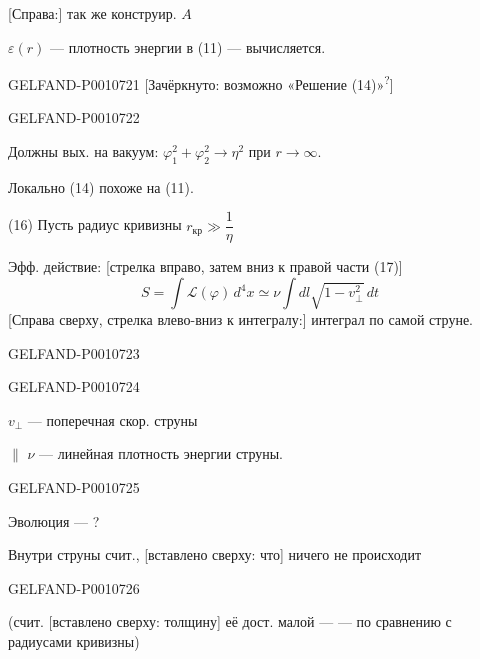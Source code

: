 [Справа:] так же конструир. $A$

$\varepsilon(r)$ — плотность энергии в (11) — вычисляется.


\begin{GelfandAdjacentEvidence}{GELFAND-P001072}{1}
[Зачёркнуто: возможно «Решение (14)»\textsuperscript{?}]
\end{GelfandAdjacentEvidence}
\begin{GelfandAdjacentEvidence}{GELFAND-P001072}{2}


Должны вых. на вакуум: $\varphi_1^2+\varphi_2^2\to\eta^2$ при $r\to\infty$.

Локально (14) похоже на (11).

(16) Пусть радиус кривизны $r_{\text{кр}}\gg\dfrac1\eta$

Эфф. действие: [стрелка вправо, затем вниз к правой части (17)]
\begin{equation*}
S=\int\mathcal L(\varphi)\,d^4x\simeq\nu\int dl\sqrt{1-v_{\perp}^2}\,dt
\tag{17}
\end{equation*}
[Справа сверху, стрелка влево-вниз к интегралу:] интеграл по самой струне.
\end{GelfandAdjacentEvidence}
\begin{GelfandAdjacentEvidence}{GELFAND-P001072}{3}

\end{GelfandAdjacentEvidence}
\begin{GelfandAdjacentEvidence}{GELFAND-P001072}{4}


$v_\perp$ — поперечная скор. струны

\(\parallel\) $\nu$ — линейная плотность энергии струны.
\end{GelfandAdjacentEvidence}
\begin{GelfandAdjacentEvidence}{GELFAND-P001072}{5}


Эволюция — ?

Внутри струны счит., [вставлено сверху: что] ничего не происходит
\end{GelfandAdjacentEvidence}
\begin{GelfandAdjacentEvidence}{GELFAND-P001072}{6}

(счит. [вставлено сверху: толщину] её дост. малой — — по сравнению с радиусами кривизны)
\end{GelfandAdjacentEvidence}
